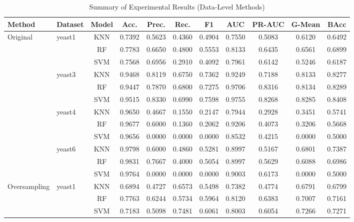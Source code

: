 \documentclass[sigconf]{acmart}
\begin{document}
\begin{table}[t]
  \centering
  \caption{Summary of Experimental Results (Data-Level Methods)}
  \label{tab:datalevel_summary}
  \scriptsize
  \setlength{\tabcolsep}{3.5pt}
  \begin{tabular}{llccccccccc}
    \toprule
    \textbf{Method} & \textbf{Dataset} & \textbf{Model} & \textbf{Acc.} & \textbf{Prec.} & \textbf{Rec.} & \textbf{F1} & \textbf{AUC} & \textbf{PR-AUC} & \textbf{G-Mean} & \textbf{BAcc} \\
    \midrule
    \multirow{12}{*}{Original} & \multirow{3}{*}{yeast1} & KNN & 0.7392 & 0.5623 & 0.4360 & 0.4904 & 0.7550 & 0.5083 & 0.6120 & 0.6492 \\
    & & RF & 0.7783 & 0.6650 & 0.4800 & 0.5553 & 0.8133 & 0.6435 & 0.6561 & 0.6899 \\
    & & SVM & 0.7568 & 0.6956 & 0.2910 & 0.4092 & 0.7961 & 0.6142 & 0.5246 & 0.6187 \\
    \cmidrule{2-11}
    & \multirow{3}{*}{yeast3} & KNN & 0.9468 & 0.8119 & 0.6750 & 0.7362 & 0.9249 & 0.7188 & 0.8133 & 0.8277 \\
    & & RF & 0.9447 & 0.7870 & 0.6800 & 0.7275 & 0.9706 & 0.8316 & 0.8134 & 0.8289 \\
    & & SVM & 0.9515 & 0.8330 & 0.6990 & 0.7598 & 0.9755 & 0.8268 & 0.8285 & 0.8408 \\
    \cmidrule{2-11}
    & \multirow{3}{*}{yeast4} & KNN & 0.9650 & 0.4667 & 0.1550 & 0.2147 & 0.7944 & 0.2928 & 0.3451 & 0.5741 \\
    & & RF & 0.9677 & 0.6000 & 0.1360 & 0.2062 & 0.9206 & 0.4073 & 0.3206 & 0.5668 \\
    & & SVM & 0.9656 & 0.0000 & 0.0000 & 0.0000 & 0.8532 & 0.4215 & 0.0000 & 0.5000 \\
    \cmidrule{2-11}
    & \multirow{3}{*}{yeast6} & KNN & 0.9798 & 0.6000 & 0.4860 & 0.5281 & 0.8997 & 0.5167 & 0.6801 & 0.7387 \\
    & & RF & 0.9831 & 0.7667 & 0.4000 & 0.5054 & 0.8997 & 0.5629 & 0.6088 & 0.6986 \\
    & & SVM & 0.9764 & 0.0000 & 0.0000 & 0.0000 & 0.9003 & 0.6173 & 0.0000 & 0.5000 \\
    \midrule
    \multirow{12}{*}{Oversampling} & \multirow{3}{*}{yeast1} & KNN & 0.6894 & 0.4727 & 0.6573 & 0.5498 & 0.7382 & 0.4774 & 0.6791 & 0.6799 \\
    & & RF & 0.7763 & 0.6244 & 0.5734 & 0.5964 & 0.8120 & 0.6383 & 0.7007 & 0.7161 \\
    & & SVM & 0.7183 & 0.5098 & 0.7481 & 0.6061 & 0.8003 & 0.6054 & 0.7266 & 0.7271 \\

\end{tabular}
\end{table}
\end{document}
